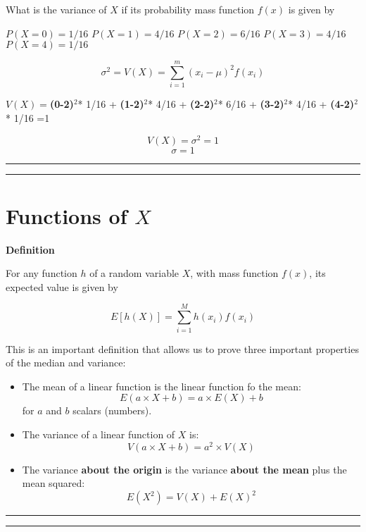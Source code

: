 \documentclass[
]{book}
\begin{document}
What is the variance of \(X\) if its probability mass function \(f(x)\) is given by

\(P(X=0)=1/16\)
\(P(X=1)=4/16\)
\(P(X=2)=6/16\)
\(P(X=3)=4/16\)
\(P(X=4)=1/16\)

\[\sigma^2 =V(X)=\sum_{i=1}^m (x_i-\mu)^2 f(x_i)\]

\(V(X)=\)\textbf{(0-2)}\(^2\)* 1/16 + \textbf{(1-2)}\(^2\)* 4/16 + \textbf{(2-2)}\(^2\)* 6/16 + \textbf{(3-2)}\(^2\)* 4/16 + \textbf{(4-2)}\(^2\)* 1/16 =1

\[V(X)=\sigma^2=1\]
\[\sigma=1\]

\begin{center}\rule{0.5\linewidth}{0.5pt}\end{center}

\begin{center}\rule{0.5\linewidth}{0.5pt}\end{center}

\hypertarget{functions-of-x}{%
\section{\texorpdfstring{Functions of \(X\)}{Functions of X}}\label{functions-of-x}}

\textbf{Definition}

For any function \(h\) of a random variable \(X\), with mass function \(f(x)\), its expected value is given by

\[ E[h(X)]= \sum_{i=1}^M h(x_i) f(x_i) \]

This is an important definition that allows us to prove three important properties of the median and variance:

\begin{itemize}
\item
  The mean of a linear function is the linear function fo the mean: \[E(a\times X +b)= a\times E(X) +b\] for \(a\) and \(b\) scalars (numbers).
\item
  The variance of a linear function of \(X\) is:\[V(a\times X +b)= a^2\times V(X)\]
\item
  The variance \textbf{about the origin} is the variance \textbf{about the mean} plus the mean squared: \[E(X^2)=V(X)+E(X)^2\]
\end{itemize}

\begin{center}\rule{0.5\linewidth}{0.5pt}\end{center}

\begin{center}\rule{0.5\linewidth}{0.5pt}\end{center}
\end{document}
